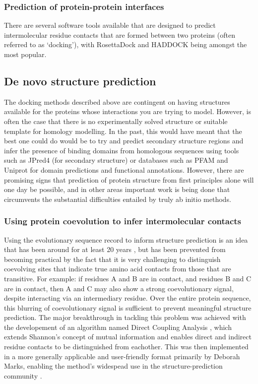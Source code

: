 \documentclass[a4paper,11pt,twoside,openright]{scrbook}
\begin{document}
\subsubsection{Prediction of protein-protein interfaces}
There are several software tools available that are designed to predict intermolecular residue contacts that are formed between two proteins (often referred to as `docking'), with RosettaDock \cite{Lyskov2008} and HADDOCK \cite{Dominguez2003,VanZundert2016} being amongst the most popular.

\subsection{De novo structure prediction}
The docking methods described above are contingent on having structures available for the proteins whose interactions you are trying to model. However, is often the case that there is no experimentally solved structure or suitable template for homology modelling. In the past, this would have meant that the best one could do would be to try and predict secondary structure regions and infer the presence of binding domains from homologous sequences using tools such as JPred4 \cite{Drozdetskiy2015} (for secondary structure) or databases such as PFAM and Uniprot \cite{Finn2016,Consortium2017} for domain predictions and functional annotations. However, there are promising signs that prediction of protein structure from first principles alone will one day be possible, and in other areas important work is being done that circumvents the substantial difficulties entailed by truly ab initio methods.

\subsubsection{Using protein coevolution to infer intermolecular contacts}
Using the evolutionary sequence record to inform structure prediction is an idea that has been around for at least 20 years \cite{Altschuh1987}, but has been prevented from becoming practical by the fact that it is very challenging to distinguish coevolving sites that indicate true amino acid contacts from those that are transitive. For example: if residues A and B are in contact, and residues B and C are in contact, then A and C may also show a strong coevolutionary signal, despite interacting via an intermediary residue. Over the entire protein sequence, this blurring of coevolutionary signal is sufficient to prevent meaningful structure prediction. The major breakthrough in tackling this problem was achieved with the developement of an algorithm named Direct Coupling Analysis \cite{Weigt2009,Lunt2010}, which extends Shannon's concept of mutual information \cite{Shannon1948} and enables direct and indirect residue contacts to be distinguished from eachother. This was then implemented in a more generally applicable and user-friendly format primarily by Deborah Marks, enabling the method's widespead use in the structure-prediction community \cite{Marks2011,Marks2012,Hopf2014}.
\end{document}
